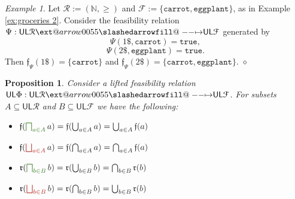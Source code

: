 \documentclass[12pt]{article}
\makeatletter
\theoremstyle{definition}
\theoremstyle{plain}
\theoremstyle{plain}
\newtheorem{proposition}[definition]{Proposition}
\theoremstyle{plain}
\theoremstyle{plain}
\theoremstyle{remark}
\newtheorem{example}[definition]{Example}
\newcommand\xqed[1]{%
	\leavevmode\unskip\penalty9999 \hbox{}\nobreak\hfill
	\quad\hbox{#1}}
\newcommand\exampleend{\xqed{$\diamond$}}
\theoremstyle{remark}
\newcommand{\mc}[1]{\mathcal{#1}}
\newcommand{\sub}{\subseteq}
\newcommand{\low}{\mathsf{L}}
\newcommand{\upper}{\mathsf{U}}
\newcommand{\true}{\mathtt{true}}
\def\slashedarrowfill@#1#2#3#4#5{%
	$\m@th\thickmuskip0mu\medmuskip\thickmuskip\thinmuskip\thickmuskip
	\relax#5#1\mkern-7mu%
	\cleaders\hbox{$#5\mkern-2mu#2\mkern-2mu$}\hfill
	\mathclap{#3}\mathclap{#2}%
	\cleaders\hbox{$#5\mkern-2mu#2\mkern-2mu$}\hfill
	\mkern-7mu#4$%
}
\def\rightslashedarrowfill@{%
	\slashedarrowfill@\relbar\relbar\mapstochar\rightarrow}
\newcommand\xslashedrightarrow[2][]{%
	\ext@arrow 0055{\rightslashedarrowfill@}{#1}{#2}}
\newcommand{\cbigsqcap}[1]{\color{OliveGreen}\bigsqcap_{#1}\color{Black}}
\newcommand{\cbigsqcup}[1]{\color{BrickRed}\bigsqcup_{#1}\color{Black}}
\makeatother
\begin{document}
\begin{example}
	Let $\mc{R} := (\mathbb{N}, \geq)$ and $\mc{F} := \{\mathtt{carrot}, \mathtt{eggplant}\}$, as in Example \ref{ex:groceries 2}. Consider the feasibility relation $\Psi: \upper\low\mc{R} \xslashedrightarrow{} \upper\low\mc{F}$ generated by 
	$$\Psi(1\$, \mathtt{carrot}) = \true ,$$
	$$\Psi(2\$, \mathtt{eggplant}) = \true. $$
	Then $\mathfrak{f}_\Psi(1\$) = \{ \mathtt{carrot} \}$ and $\mathfrak{f}_\Psi(2\$) = \{ \mathtt{carrot}, \mathtt{eggplant} \}$.
	\exampleend
\end{example}

\begin{proposition}\label{prop:querying formulas} Consider a lifted feasibility relation $\upper\low\Phi: \upper\low\mc{R} \xslashedrightarrow{} \upper\low\mc{F}$. For subsets $A \sub \upper\low\mc{R}$ and $B \sub \upper\low\mc{F}$ we have the following:
	\begin{itemize}
		\item[(i)] $\mathfrak{f}(\cbigsqcap{a \in A} a) = \mathfrak{f}(\bigcup_{a \in A} a) = \bigcup_{a \in A}\mathfrak{f}(a)$
		\item[(ii)] $\mathfrak{f}(\cbigsqcup{a \in A} a) = \mathfrak{f}(\bigcap_{a \in A} a) = \bigcap_{a \in A}\mathfrak{f}(a)$
		\item[(iii)] $\mathfrak{r}(\cbigsqcap{b \in B} b) = \mathfrak{r}(\bigcup_{b \in B} b) = \bigcap_{b \in B}\mathfrak{r}(b)$
		\item[(iv)] $\mathfrak{r}(\cbigsqcup{b \in B} b) = \mathfrak{r}(\bigcap_{b \in B} b) = \bigcup_{b \in B}\mathfrak{r}(b)$
	\end{itemize}
\end{proposition}
\end{document}
